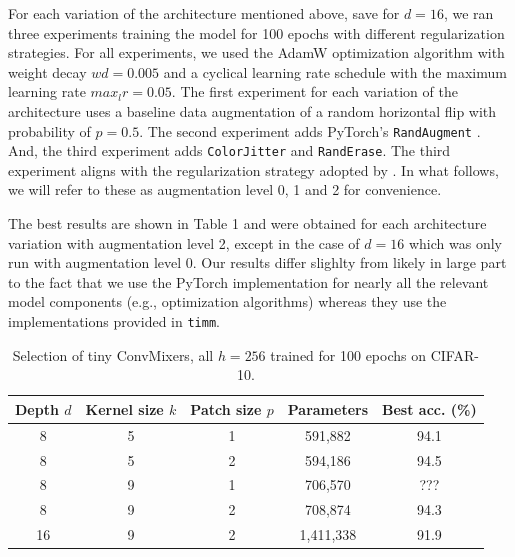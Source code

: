 \documentclass[letterpaper]{article} %
\begin{document}
For each variation of the architecture mentioned above, save for $d=16$, we ran three experiments training the model for 100 epochs with different regularization strategies. For all experiments, we used the AdamW optimization algorithm \citep{Loshchilov2017} with weight decay $wd=0.005$ and a cyclical learning rate schedule \citep{Smith2017} with the maximum learning rate $max_lr=0.05$. The first experiment for each variation of the architecture uses a baseline data augmentation of a random horizontal flip with probability of $p=0.5$. The second experiment adds PyTorch's \verb|RandAugment| \citep{Cubuk2019}. And, the third experiment adds \verb|ColorJitter| and \verb|RandErase|\citep{Zhong2017}. The third experiment aligns with the regularization strategy adopted by \citet{trockman2022patches}. In what follows, we will refer to these as augmentation level 0, 1 and 2 for convenience.

The best results are shown in Table 1 and were obtained for each architecture variation with augmentation level 2, except in the case of $d=16$ which was only run with augmentation level 0. Our results differ slighlty from \citet{trockman2022patches} likely in large part to the fact that we use the PyTorch implementation for nearly all the relevant model components (e.g., optimization algorithms) whereas they use the implementations provided in \verb|timm|.

\begin{table}
    \begin{tabular}{|c|c|c|c|c|}
        \hline
        \hline 
        Depth $d$& Kernel size $k$& Patch size $p$& Parameters & Best acc. (\%) \\
        \hline
        8 & 5 & 1 & 591,882 & 94.1 \\
        8 & 5 & 2 & 594,186 & 94.5 \\
        8 & 9 & 1 & 706,570 & ??? \\
        8 & 9 & 2 & 708,874 & 94.3 \\
        16 & 9 & 2 & 1,411,338 & 91.9 \\
        \hline
    \end{tabular}
    \caption{Selection of tiny ConvMixers, all $h=256$ trained for 100 epochs on CIFAR-10.}
\end{table}
\end{document}
